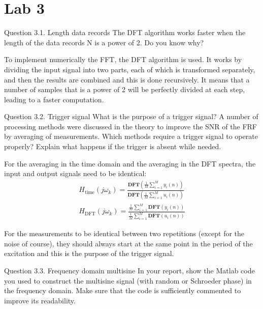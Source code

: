 \setcounter{secnumdepth}{1}

\chapter{Lab 3}


\begin{Task}{Question 3.1. Length data records}
    The DFT algorithm works faster when the length of the data records N is a power of 2. Do you know why?
\end{Task}

To implement numerically the FFT, the DFT algorithm is used. It works by dividing the input signal into two parts, each of which is transformed separately, and then the results are combined and this is done recursively. It means that a number of samples that is a power of 2 will be perfectly divided at each step, leading to a faster computation.

\begin{Task}{Question 3.2. Trigger signal}
    What is the purpose of a trigger signal? A number of processing methods were discussed in the theory to improve the SNR of the FRF by averaging of measurements. Which methods require a trigger signal to operate properly? Explain what happens if the trigger is absent while needed.
\end{Task}

For the averaging in the time domain and the averaging in the DFT spectra, the input and output signals need to be identical:
\begin{align*}
    H_{\text{time}}(j\omega_k) = \frac{\textbf{DFT}\left(\frac{1}{M}\sum_{i=1}^{M}y_i(n)\right)}{\textbf{DFT}\left(\frac{1}{M}\sum_{i=1}^{M}u_i(n)\right)}\\
    H_{\text{DFT}}(j\omega_k) = \frac{\frac{1}{M}\sum_{i=1}^{M}\textbf{DFT}\left(y_i(n)\right)}{\frac{1}{M}\sum_{i=1}^{M}\textbf{DFT}\left(u_i(n)\right)}
\end{align*}

For the measurements to be identical between two repetitions (except for the noise of course), they should always start at the same point in the period of the excitation and this is the purpose of the trigger signal.

\begin{Task}{Question 3.3. Frequency domain multisine}
    In your report, show the Matlab code you used to construct the multisine signal (with random or Schroeder phase) in the frequency domain. Make sure that the code is sufficiently commented to improve its readability.
\end{Task}

